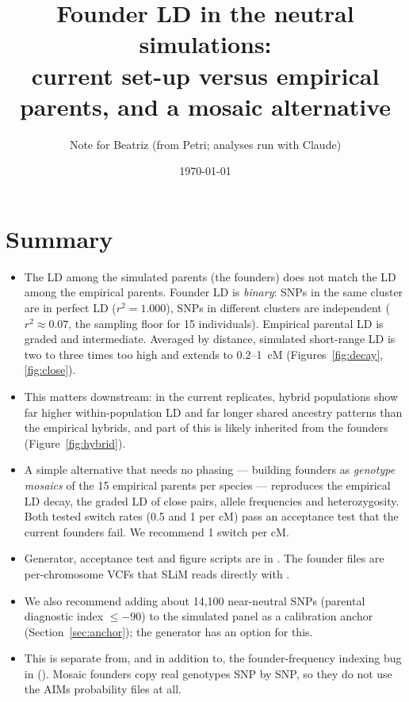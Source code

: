 \documentclass[11pt,a4paper]{article}
\title{Founder LD in the neutral simulations:\\ current set-up versus empirical parents, and a mosaic alternative}
\author{Note for Beatriz (from Petri; analyses run with Claude)}
\date{\today}
\begin{document}
\maketitle

\section*{Summary}
\begin{itemize}
  \item The LD among the simulated parents (the founders) does not match the LD among the empirical parents. Founder LD is \emph{binary}: SNPs in the same  cluster are in perfect LD ($r^2=1.000$), SNPs in different clusters are independent ($r^2\approx0.07$, the sampling floor for 15 individuals). Empirical parental LD is graded and intermediate. Averaged by distance, simulated short-range LD is two to three times too high and extends to 0.2--1~cM (Figures~\ref{fig:decay}, \ref{fig:close}).
  \item This matters downstream: in the current replicates, hybrid populations show far higher within-population LD and far longer shared ancestry patterns than the empirical hybrids, and part of this is likely inherited from the founders (Figure~\ref{fig:hybrid}).
  \item A simple alternative that needs no phasing --- building founders as \emph{genotype mosaics} of the 15 empirical parents per species --- reproduces the empirical LD decay, the graded LD of close pairs, allele frequencies and heterozygosity. Both tested switch rates (0.5 and 1 per cM) pass an acceptance test that the current founders fail. We recommend 1 switch per cM.
  \item Generator, acceptance test and figure scripts are in . The founder files are per-chromosome VCFs that SLiM reads directly with .
  \item We also recommend adding about 14,100 near-neutral SNPs (parental diagnostic index $\leq-90$) to the simulated panel as a calibration anchor (Section~\ref{sec:anchor}); the generator has an option for this.
  \item This is separate from, and in addition to, the founder-frequency indexing bug in  (). Mosaic founders copy real genotypes SNP by SNP, so they do not use the AIMs probability files at all.
\end{itemize}
\end{document}
